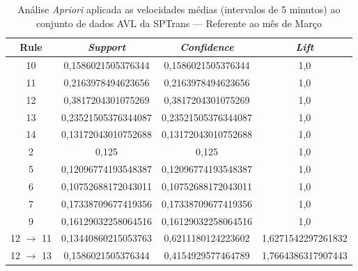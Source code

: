 \documentclass[
	12pt,				%
	oneside,			%
	a4paper,			%
	english,			%
	brazil				%
	]{abntex2ppgsi}
\begin{document}
\begin{apendicesenv}
\begin{table}[!htb]
\centering
\caption {Análise \textit{Apriori} aplicada as velocidades médias (intervalos de 5 minutos) ao conjunto de dados AVL da SPTrans --- Referente ao mês de Março}
\label {tab:aprioriMarch}
\begin{tabular}{c|c|c|c}
\hline
\textbf{Rule} & \textit{\textbf{Support}} & \textit{\textbf{Confidence}} & \textit{\textbf{Lift}} \\
\hline 
10 &  0,1586021505376344 &  0,1586021505376344 &  1,0\\ 
\hline 
11 &  0,2163978494623656 &  0,2163978494623656 &  1,0\\ 
\hline 
12 &  0,3817204301075269 &  0,3817204301075269 &  1,0\\ 
\hline 
13 &  0,23521505376344087 &  0,23521505376344087 &  1,0\\ 
\hline 
14 &  0,13172043010752688 &  0,13172043010752688 &  1,0\\ 
\hline 
2 &  0,125 &  0,125 &  1,0\\ 
\hline 
5 &  0,12096774193548387 &  0,12096774193548387 &  1,0\\ 
\hline 
6 &  0,10752688172043011 &  0,10752688172043011 &  1,0\\ 
\hline 
7 &  0,17338709677419356 &  0,17338709677419356 &  1,0\\ 
\hline 
9 &  0,16129032258064516 &  0,16129032258064516 &  1,0\\ 
\hline 
12 $\rightarrow$ 11 &  0,13440860215053763 &  0,6211180124223602 &  1,6271542297261832\\ 
\hline 
12 $\rightarrow$ 13 &  0,1586021505376344 &  0,4154929577464789 &  1,7664386317907443\\
\hline
\end{tabular}
\end{table}



\end{apendicesenv}
\end{document}
